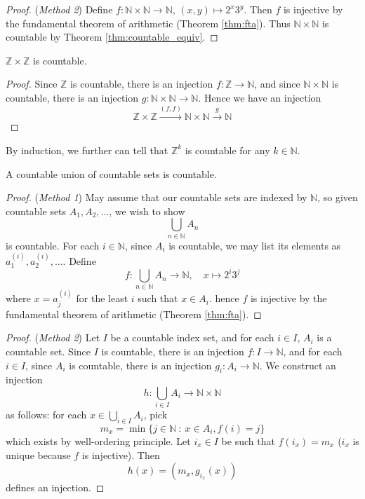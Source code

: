 \documentclass[10pt, a4paper, twoside]{report}
\begin{document}
\begin{proof}
    (\emph{Method 2}) Define \(f:\mathbb{N}\times\mathbb{N}\to\mathbb{N}\), \((x,y)\mapsto 2^x3^y\). Then \(f\) is injective by the fundamental theorem of arithmetic (Theorem \ref{thm:fta}). Thus \(\mathbb{N}\times\mathbb{N}\) is countable by Theorem \ref{thm:countable_equiv}.
\end{proof}
\begin{corollary}
    \(\mathbb{Z}\times\mathbb{Z}\) is countable.
\end{corollary}
\begin{proof}
    Since \(\mathbb{Z}\) is countable, there is an injection \(f:\mathbb{Z}\to\mathbb{N}\), and since \(\mathbb{N}\times\mathbb{N}\) is countable, there is an injection \(g:\mathbb{N}\times\mathbb{N}\to\mathbb{N}\). Hence we have an injection 
    \[\mathbb{Z}\times\mathbb{Z}\xrightarrow{(f,f)}\mathbb{N}\times\mathbb{N}\xrightarrow{g}\mathbb{N}\] 
\end{proof}
By induction, we further can tell that \(\mathbb{Z}^k\) is countable for any \(k\in\mathbb{N}\).
\begin{theorem}
    A countable union of countable sets is countable.
    \label{thm:union_countable}
\end{theorem}
\begin{proof}
    (\emph{Method 1}) May assume that our countable sets are indexed by \(\mathbb{N}\), so given countable sets \(A_1,A_2,\ldots\), we wish to show 
    \[\bigcup_{n\in\mathbb{N}}A_n\]
    is countable. For each \(i\in\mathbb{N}\), since \(A_i\) is countable, we may list its elements as \(a_1^{(i)},a_2^{(i)},\ldots\). Define
    \[f:\bigcup_{n\in\mathbb{N}}A_n\to\mathbb{N},\quad x\mapsto 2^i3^j\]
    where \(x=a_j^{(i)}\) for the least \(i\) such that \(x\in A_i\). hence \(f\) is injective by the fundamental theorem of arithmetic (Theorem \ref{thm:fta}).
\end{proof}
\begin{proof}
    (\emph{Method 2}) Let \(I\) be a countable index set, and for each \(i\in I\), \(A_i\) is a countable set. Since \(I\) is countable, there is an injection \(f:I\to\mathbb{N}\), and for each \(i\in I\), since \(A_i\) is countable, there is an injection \(g_i:A_i\to\mathbb{N}\). We construct an injection 
    \[h:\bigcup_{i\in{I}}A_i\to\mathbb{N}\times\mathbb{N}\]
    as follows: for each \(x\in\bigcup_{i\in{I}}A_i\), pick 
    \[m_x=\min\{j\in\mathbb{N}\::\:x\in A_i,f(i)=j\}\]
    which exists by well-ordering principle. Let \(i_x\in I\) be such that \(f(i_x)=m_x\) (\(i_x\) is unique because \(f\) is injective). Then 
    \[h(x)=(m_x,g_{i_x}(x))\]
    defines an injection.
\end{proof}
\end{document}
